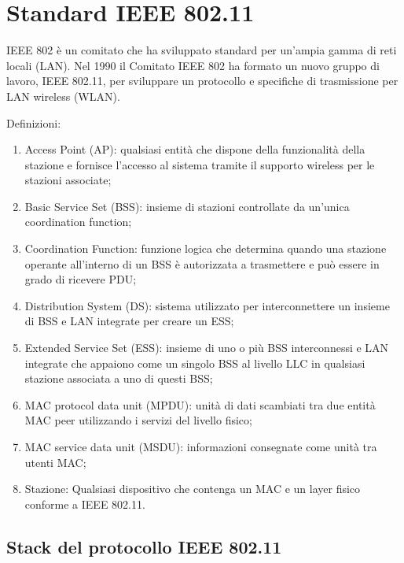 \section{Standard IEEE 802.11}

IEEE 802 è un comitato che ha sviluppato standard per un'ampia gamma di reti locali (LAN). Nel 1990 il Comitato IEEE 802 ha formato un nuovo gruppo di lavoro, IEEE 802.11, per sviluppare un protocollo e specifiche di trasmissione per LAN wireless (WLAN). 

Definizioni:
\begin{enumerate}
    \item Access Point (AP): qualsiasi entità che dispone della funzionalità della stazione e fornisce l'accesso al sistema tramite il supporto wireless per le stazioni associate;
	\item Basic Service Set (BSS): insieme di stazioni controllate da un'unica coordination function;
	\item Coordination Function: funzione logica che determina quando una stazione operante all'interno di un BSS è autorizzata a trasmettere e può essere in grado di ricevere PDU;
	\item Distribution System (DS): sistema utilizzato per interconnettere un insieme di BSS e LAN integrate per creare un ESS;
	\item Extended Service Set (ESS): insieme di uno o più BSS interconnessi e LAN integrate che appaiono come un singolo BSS al livello LLC in qualsiasi stazione associata a uno di questi BSS;
	\item MAC protocol data unit (MPDU): unità di dati scambiati tra due entità MAC peer utilizzando i servizi del livello fisico;
	\item MAC service data unit (MSDU): informazioni consegnate come unità tra utenti MAC;
	\item Stazione: Qualsiasi dispositivo che contenga un MAC e un layer fisico conforme a IEEE 802.11.
\end{enumerate}

\subsection{Stack del protocollo IEEE 802.11}

